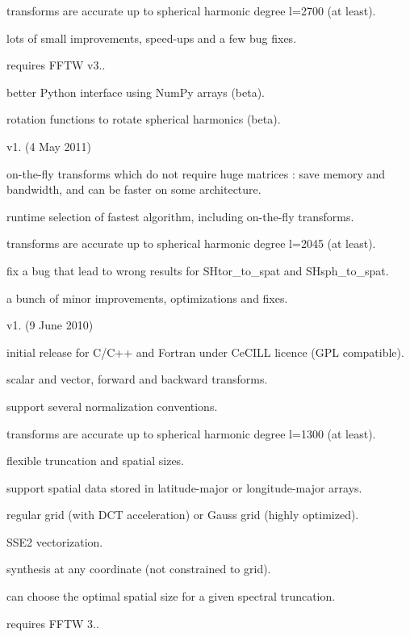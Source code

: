 \begin{DoxyItemize}
\begin{DoxyItemize}
\item transforms are accurate up to spherical harmonic degree l=2700 (at least).
\item lots of small improvements, speed-\/ups and a few bug fixes.
\item requires F\+F\+T\+W v3..
\item better Python interface using Num\+Py arrays (beta).
\item rotation functions to rotate spherical harmonics (beta).
\end{DoxyItemize}
\item v1. (4 May 2011)
\begin{DoxyItemize}
\item on-\/the-\/fly transforms which do not require huge matrices \+: save memory and bandwidth, and can be faster on some architecture.
\item runtime selection of fastest algorithm, including on-\/the-\/fly transforms.
\item transforms are accurate up to spherical harmonic degree l=2045 (at least).
\item fix a bug that lead to wrong results for {\ttfamily S\+Htor\+\_\+to\+\_\+spat} and {\ttfamily S\+Hsph\+\_\+to\+\_\+spat}.
\item a bunch of minor improvements, optimizations and fixes.
\end{DoxyItemize}
\item v1. (9 June 2010)
\begin{DoxyItemize}
\item initial release for C/\+C++ and Fortran under Ce\+C\+I\+L\+L licence (G\+P\+L compatible).
\item scalar and vector, forward and backward transforms.
\item support several normalization conventions.
\item transforms are accurate up to spherical harmonic degree l=1300 (at least).
\item flexible truncation and spatial sizes.
\item support spatial data stored in latitude-\/major or longitude-\/major arrays.
\item regular grid (with D\+C\+T acceleration) or Gauss grid (highly optimized).
\item S\+S\+E2 vectorization.
\item synthesis at any coordinate (not constrained to grid).
\item can choose the optimal spatial size for a given spectral truncation.
\item requires F\+F\+T\+W 3.. 
\end{DoxyItemize}
\end{DoxyItemize}